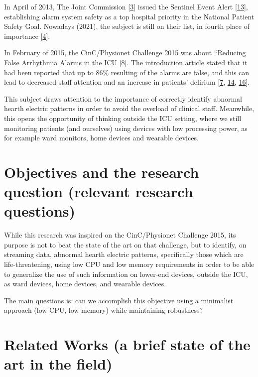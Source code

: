 \documentclass[runningheads]{llncs}
\begin{document}
In April of 2013, The Joint Commission {[}\protect\hyperlink{ref-the_jc}{3}{]} issued the Sentinel Event Alert
{[}\protect\hyperlink{ref-JointCommission2013}{13}{]}, establishing alarm system safety as a top hospital priority in the National
Patient Safety Goal. Nowadays (2021), the subject is still on their list, in fourth place of
importance {[}\protect\hyperlink{ref-the_jc2021}{4}{]}.

In February of 2015, the CinC/Physionet Challenge 2015 was about ``Reducing False Arrhythmia Alarms
in the ICU {[}\protect\hyperlink{ref-Clifford2015}{8}{]}. The introduction article stated that it had been reported that up to 86\%
resulting of the alarms are false, and this can lead to decreased staff attention and an increase in
patients' delirium {[}\protect\hyperlink{ref-Chambrin2001}{7}, \protect\hyperlink{ref-Lawless1994}{14}, \protect\hyperlink{ref-Parthasarathy2004}{16}{]}.

This subject draws attention to the importance of correctly identify abnormal hearth electric patterns
in order to avoid the overload of clinical staff. Meanwhile, this opens the opportunity of thinking
outside the ICU setting, where we still monitoring patients (and ourselves) using devices with
low processing power, as for example ward monitors, home devices and wearable devices.

\hypertarget{objectives-and-the-research-question-relevant-research-questions}{%
\section{Objectives and the research question (relevant research questions)}\label{objectives-and-the-research-question-relevant-research-questions}}

While this research was inspired on the CinC/Physionet Challenge 2015, its purpose is not to beat
the state of the art on that challenge, but to identify, on streaming data, abnormal hearth electric
patterns, specifically those which are life-threatening, using low CPU and low memory requirements
in order to be able to generalize the use of such information on lower-end devices, outside the ICU,
as ward devices, home devices, and wearable devices.

The main questions is: can we accomplish this objective using a minimalist approach (low CPU, low
memory) while maintaining robustness?

\hypertarget{related-works-a-brief-state-of-the-art-in-the-field}{%
\section{Related Works (a brief state of the art in the field)}\label{related-works-a-brief-state-of-the-art-in-the-field}}
\end{document}
